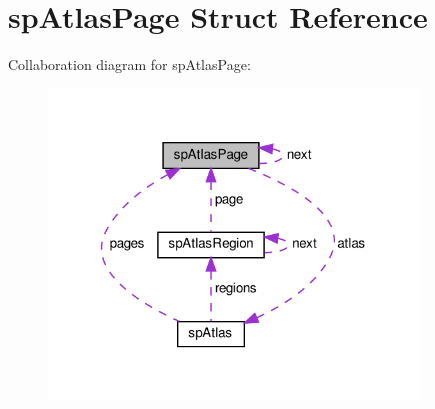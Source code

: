 \hypertarget{structspAtlasPage}{}\section{sp\+Atlas\+Page Struct Reference}
\label{structspAtlasPage}


Collaboration diagram for sp\+Atlas\+Page\+:
\nopagebreak
\begin{figure}[H]
\begin{center}
\leavevmode
\includegraphics[width=279pt]{structspAtlasPage__coll__graph}
\end{center}
\end{figure}
